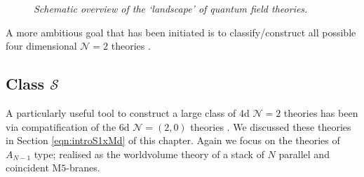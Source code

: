 \documentclass[main.tex]{subfiles}
\begin{document}
\begin{figure}
\centering
{}
  \caption{\it Schematic overview of the `landscape' of quantum field theories.}
  \label{fig:lndscpeofqfts}
\end{figure}

A more ambitious goal that has been initiated is to classify/construct all possible four dimensional $\mathcal{N}=2$ theories \cite{Argyres:2016xua,Argyres:2015gha,Bhardwaj:2013qia,KOH1984397,DERENDINGER1984133,JIANG1984370,Jiang_1984}.

\subsection{Class \texorpdfstring{$\mathcal{S}$}{S}}
A particularly useful tool to construct a large class of 4d $\mathcal{N}=2$ theories has been via compatification of the 6d $\mathcal{N}=(2,0)$ theories \cite{Gaiotto:2009we,Gaiotto:2009hg}.  We discussed these theories in Section \ref{eqn:introS1xMd} of this chapter.  Again we focus on the theories of $A_{N-1}$ type; realised as the worldvolume theory of a stack of $N$ parallel and coincident M$5$-branes.  
\end{document}
